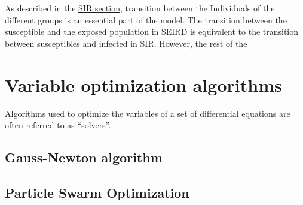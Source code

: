 As described in the \hyperref[sec:SIR]{SIR section}, transition between the Individuals of the different groups is an essential
part of the model. The transition between the susceptible and the exposed population in SEIRD is equivalent to the transition
between susceptibles and infected in SIR. However, the rest of the 



\section{Variable optimization algorithms}
Algorithms used to optimize the variables of a set of differential equations are often referred to as ``solvers''.%


\subsection{Gauss-Newton algorithm}
\label{sec:Gauss}


\subsection{Particle Swarm Optimization}
\label{sec:PSO}

